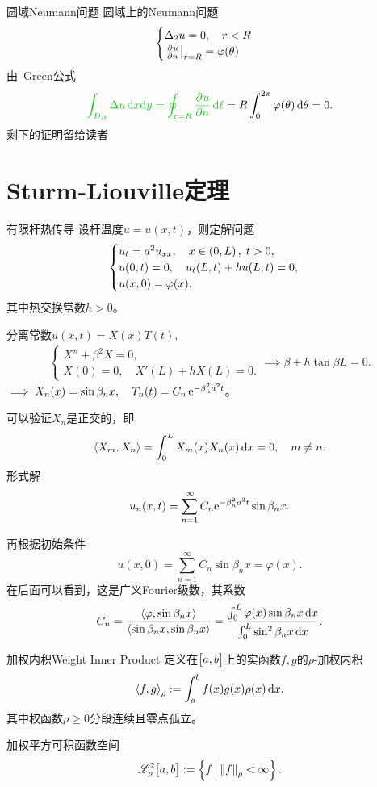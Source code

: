 \begin{example}{圆域Neumann问题}{}
	圆域上的Neumann问题
	\begin{align*}
		\begin{cases}
			\Delta_2u=0,\quad r<R\\
			\left.\frac{\partial^{{}}u}{\partial{n}^{{}}}\right\rvert_{r=R}=\varphi(\theta)
		\end{cases}
	\end{align*}
	由~\textcolor[rgb]{0,.8,0}{Green公式}
	\begin{align*}
		{\color[rgb]{0,.8,0}{\int_{D_R}\lap u\d x\nd y=\oint_{r=R}\pv un\d\ell}}=R\int_0^{2\pi}\varphi(\theta)\d\theta=0.
	\end{align*}
	剩下的证明留给读者
\end{example}

\section{Sturm-Liouville定理}
\begin{example}{有限杆热传导}{}
	设杆温度$u=u(x,t)$，则定解问题
	\begin{align*}
		\begin{cases}
			u_t=a^2u_{xx},\quad x\in\left(0,L\right),\;t>0,\\
			u(0,t)=0,\quad u_t(L,t)+hu(L,t)=0,\\
			u(x,0)=\varphi(x).
		\end{cases}
	\end{align*}
	其中热交换常数$h>0$。
	
	分离常数$u(x,t)=X(x)T(t),$
	\begin{align*}
		\begin{cases}
			X''+\beta^2X=0, \\
			X(0)=0,\quad X'(L)+hX(L)=0.
		\end{cases}\implies\beta+h\tan\beta L=0.
	\end{align*}
	$\implies X_n(x)=\sin\beta_nx,\quad T_n(t)=C_n\mathop{}\!\mathrm{e}^{-\beta_n^2a^2t}$。
	
	可以验证$X_n$是正交的，即
	\[
		\left\langle X_m,X_n\right\rangle=\int_0^LX_m(x)X_n(x)\mathop{}\!\mathrm{d} x=0,\quad m\neq n.
	\]
	形式解
	\[
		u_n(x,t)=\sum_{n=1}^\infty C_n\mathrm e^{-\beta_n^2a^2t}\sin\beta_nx.
	\]
	
	再根据初始条件
	\[
		u(x,0)=\sum_{n=1}^\infty C_n\sin\beta_nx=\varphi(x).
	\]
	在后面可以看到，这是广义Fourier级数，其系数
	\[
		C_n=\frac{\left\langle \varphi,\sin\beta_nx\right\rangle}{\left\langle \sin\beta_nx,\sin\beta_nx\right\rangle}=\frac{\int_0^L\varphi(x)\sin\beta_nx\mathop{}\!\mathrm{d} x}{\int_0^L\sin^2\beta_nx\mathop{}\!\mathrm{d} x}.
	\]
\end{example}
\begin{definition}{加权内积}{Weight Inner Product}
	定义在$\bigl[a,b\bigr]$上的实函数$f,g$的$\rho$\;-\;加权内积
	\[
		\left\langle f,g\right\rangle_\rho:=\int_a^bf(x)g(x)\rho(x)\mathop{}\!\mathrm{d} x.
	\]
	其中权函数$\rho\geqslant 0$分段连续且零点孤立。

	加权平方可积函数空间
	\[
		\mathscr L_\rho^2\bigl[a,b\bigr]:=\left\{f\,\middle\vert\,\left\lVert f\right\rVert_\rho<\infty\right\}.
	\]
\end{definition}
